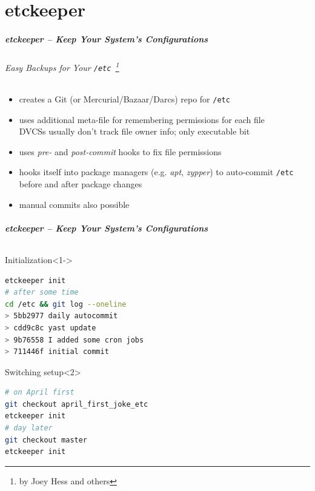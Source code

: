 \documentclass[english,hyperref={pdfpagelabels=false},aspectratio=1610]{beamer}
\begin{document}
\part{etckeeper}
\makepart

\begin{frame}[label=etckeeper]
  \frametitle{etckeeper -- Keep Your System's Configurations}
  \framesubtitle{Easy Backups for Your \texttt{/etc}~\footnote{\tiny by Joey Hess and others}}
  \begin{itemize}
    \item creates a Git {\scriptsize\color{fzjgray50}(or Mercurial/Bazaar/Darcs)} repo for \texttt{/etc}
    \item uses additional meta-file for remembering permissions for each file\\
      {\scriptsize DVCSs usually don't track file owner info; only executable bit}
    \item uses \textit{pre-} and \textit{post-commit} hooks to fix file permissions
    \item hooks itself into package managers {\scriptsize\color{fzjgray50}(e.g. \textit{apt}, \textit{zypper})} to auto-commit \texttt{/etc} \\
      before and after package changes
    \item manual commits also possible
  \end{itemize}
\end{frame}

\begin{frame}[fragile]
  \frametitle{etckeeper -- Keep Your System's Configurations}
  \framesubtitle{}
  \begin{block}{Initialization}<1->
    \vspace{-0.75em}
    \begin{lstlisting}[language=zsh]
etckeeper init
# after some time
cd /etc && git log --oneline
> 5bb2977 daily autocommit
> cdd9c8c yast update
> 9b76558 I added some cron jobs
> 711446f initial commit
    \end{lstlisting}
    \vspace{-0.75em}
  \end{block}
  \begin{block}{Switching setup}<2>
    \vspace{-0.75em}
    \begin{lstlisting}[language=zsh]
# on April first
git checkout april_first_joke_etc
etckeeper init
# day later
git checkout master
etckeeper init
    \end{lstlisting}
    \vspace{-0.75em}
  \end{block}
\end{frame}
\end{document}
